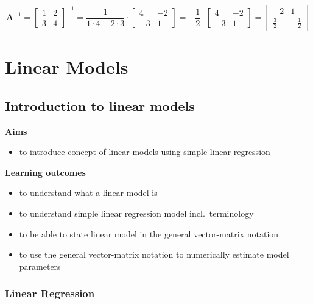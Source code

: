 \documentclass[
]{book}
\providecommand{\tightlist}{%
  \setlength{\itemsep}{0pt}\setlength{\parskip}{0pt}}
\theoremstyle{definition}
\theoremstyle{definition}
\theoremstyle{definition}
\theoremstyle{remark}
\begin{document}
\[\mathbf{A}^{-1} = \begin{bmatrix}
  1 & 2   \\
  3 & 4 
\end{bmatrix}^{-1} = \frac{1}{1 \cdot 4 - 2 \cdot 3} \cdot \begin{bmatrix}
  4 & -2   \\
  -3 & 1
\end{bmatrix} = -\frac{1}{2} \cdot \begin{bmatrix}
  4 & -2   \\
  -3 & 1
\end{bmatrix} = \begin{bmatrix}
  -2 & 1   \\
  \frac{3}{2} & -\frac{1}{2}
\end{bmatrix}\]

\hypertarget{part-linear-models}{%
\part{Linear Models}\label{part-linear-models}}

\hypertarget{introduction-to-linear-models}{%
\chapter{Introduction to linear models}\label{introduction-to-linear-models}}

\textbf{Aims}

\begin{itemize}
\tightlist
\item
  to introduce concept of linear models using simple linear regression
\end{itemize}

\textbf{Learning outcomes}

\begin{itemize}
\tightlist
\item
  to understand what a linear model is
\item
  to understand simple linear regression model incl.~terminology
\item
  to be able to state linear model in the general vector-matrix notation
\item
  to use the general vector-matrix notation to numerically estimate model parameters
\end{itemize}

\hypertarget{linear-regression}{%
\section{Linear Regression}\label{linear-regression}}
\end{document}
